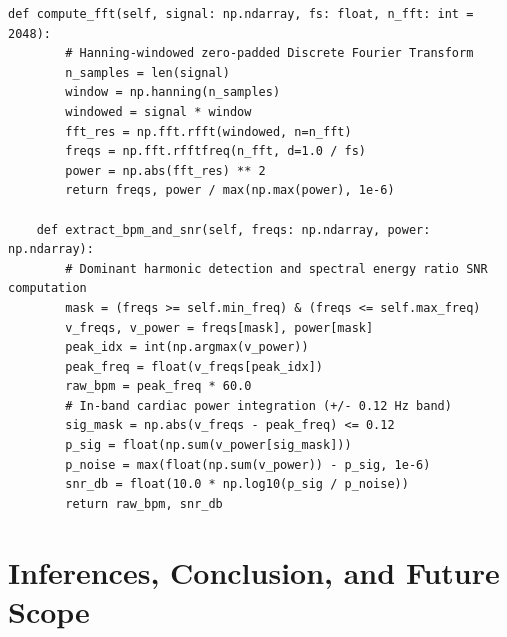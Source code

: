 \documentclass[11pt,a4paper]{report}
\begin{document}
\begin{lstlisting}[caption={Core Discrete Signal Processing Engine (\texttt{dsp\_pipeline.py})}, label={lst:dsp_code}]
    def compute_fft(self, signal: np.ndarray, fs: float, n_fft: int = 2048):
        # Hanning-windowed zero-padded Discrete Fourier Transform
        n_samples = len(signal)
        window = np.hanning(n_samples)
        windowed = signal * window
        fft_res = np.fft.rfft(windowed, n=n_fft)
        freqs = np.fft.rfftfreq(n_fft, d=1.0 / fs)
        power = np.abs(fft_res) ** 2
        return freqs, power / max(np.max(power), 1e-6)

    def extract_bpm_and_snr(self, freqs: np.ndarray, power: np.ndarray):
        # Dominant harmonic detection and spectral energy ratio SNR computation
        mask = (freqs >= self.min_freq) & (freqs <= self.max_freq)
        v_freqs, v_power = freqs[mask], power[mask]
        peak_idx = int(np.argmax(v_power))
        peak_freq = float(v_freqs[peak_idx])
        raw_bpm = peak_freq * 60.0
        # In-band cardiac power integration (+/- 0.12 Hz band)
        sig_mask = np.abs(v_freqs - peak_freq) <= 0.12
        p_sig = float(np.sum(v_power[sig_mask]))
        p_noise = max(float(np.sum(v_power)) - p_sig, 1e-6)
        snr_db = float(10.0 * np.log10(p_sig / p_noise))
        return raw_bpm, snr_db
\end{lstlisting}

\chapter{Inferences, Conclusion, and Future Scope}
\end{document}
